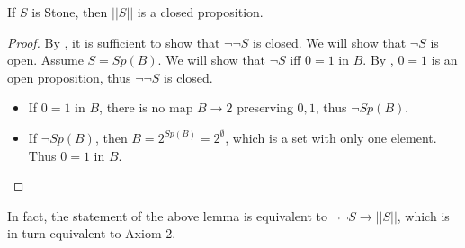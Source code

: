 \begin{lemma}\label{LemInhabitedOfStoneIsClosed}
  If $S$ is Stone, then $||S||$ is a closed proposition. 
\end{lemma} 
\begin{proof}
  By , it is sufficient to show that 
  $\neg \neg S$ is closed. We will show that $\neg S$ is open. 
  Assume $S= Sp(B)$. We will show that $\neg S$ iff $0=1$ in $B$. 
  By , $0=1$ is an open proposition, thus $\neg \neg S$ is closed. 
  \begin{itemize}
    \item If $0=1$ in $B$, there is no map $B\to 2$ preserving $0,1$, thus $\neg Sp(B)$. 
    \item If $\neg Sp(B)$, then $B=2^{Sp(B)}=2^\emptyset$, which is a set with only one element. Thus $0=1$ in $B$. 
  \end{itemize}
\end{proof}
In fact, the statement of the above lemma is equivalent to 
$\neg \neg S \to ||S||$, which is in turn equivalent to Axiom 2. 






